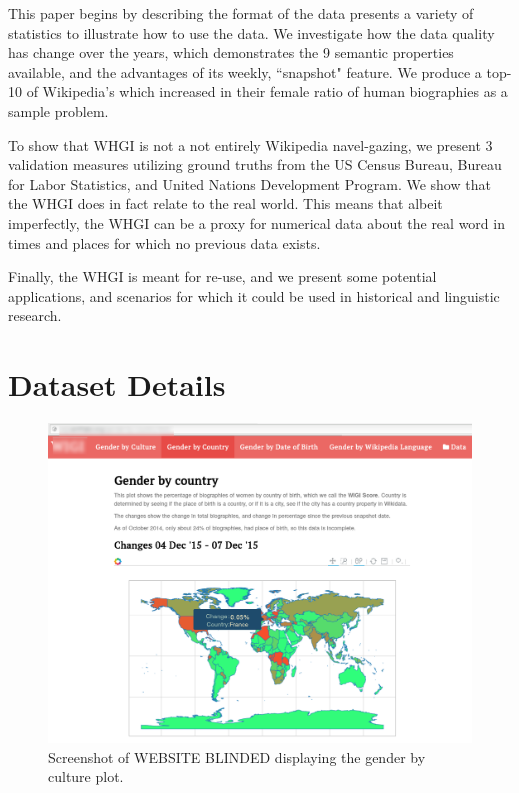 \documentclass[letterpaper]{article}
\begin{document}
This paper begins by describing the format of the data presents a variety of statistics to illustrate how to use the data. We investigate how the data quality has change over the years, which demonstrates the 9 semantic properties available, and the advantages of its weekly, ``snapshot" feature. We produce a top-10 of Wikipedia’s which increased in their female ratio of human biographies as a sample problem. 

To show that WHGI is not a not entirely Wikipedia navel-gazing, we present 3 validation measures utilizing ground truths from the US Census Bureau, Bureau for Labor Statistics, and United Nations Development Program. We show that the WHGI does in fact relate to the real world. This means that albeit imperfectly, the WHGI can be a proxy for numerical data about the real word in times and places for which no previous data exists.

Finally, the WHGI is meant for re-use, and we present some potential applications, and scenarios for which it could be used in historical and linguistic research.  

\section{Dataset Details}

\begin{figure}
\label{fig:screenshot}
\includegraphics[scale=0.2]{figures/website_screenshot.png} 
\caption{Screenshot of WEBSITE BLINDED displaying the gender by culture plot.}
\end{figure}
\end{document}
